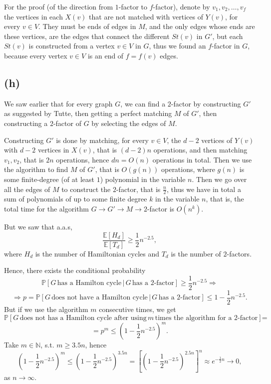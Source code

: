\documentclass{article}
\begin{document}
For the proof (of the direction from $1$-factor to $f$-factor), denote by $v_1,v_2,\dots,v_f$ the vertices in each $X(v)$ that are not matched with vertices of $Y(v)$, for every $v\in{V}$. They must be ends of edges in $M$, and the only edges whose ends are these vertices, are the edges that connect the different $St(v)$ in $G'$, but each $St(v)$ is constructed from a vertex $v\in{V}$ in $G$, thus we found an $f$-factor in $G$, because every vertex $v\in{V}$ is an end of $f=f(v)$ edges.
\subsection*{(h)}
We saw earlier that for every graph $G$, we can find a $2$-factor by constructing $G'$ as suggested by Tutte, then getting a perfect matching $M$ of $G'$, then constructing a $2$-factor of $G$ by selecting the edges of $M$. 

Constructing $G'$ is done by matching, for every $v\in{V}$, the $d-2$ vertices of $Y(v)$ with $d-2$ vertices in $X(v)$, that is $(d-2)n$ operations, and then matching $v_1,v_2$, that is $2n$ operations, hence $dn=O(n)$ operations in total.
Then we use the algorithm to find $M$ of $G'$, that is $O(g(n))$ operations, where $g(n)$ is some finite-degree (of at least $1$) polynomial in the variable $n$. Then we go over all the edges of $M$ to construct the $2$-factor, that is $\frac{n}{2}$, thus we have in total a sum of polynomials of up to some finite degree $k$ in the variable $n$, that is, the total time for the algorithm $G\rightarrow{G'}\rightarrow{M}\rightarrow{2}$-factor is $O(n^k)$.

But we saw that a.a.s,
\[
\frac{\mathbb{E}[H_d]}{\mathbb{E}[T_d]}\geq\frac{1}{2}n^{-2.5},
\]
where $H_d$ is the number of Hamiltonian cycles and $T_d$ is the number of $2$-factors.

Hence, there exists the conditional probability
\[\mathbb{P}[G\,\text{has a Hamilton cycle}\,|\,G\,\text{has a 2-factor}]\geq\frac{1}{2}n^{-2.5}\Rightarrow\]\[\Rightarrow{p}=\mathbb{P}[G\,\text{does not have a Hamilton cycle}\,|\,G\,\text{has a 2-factor}]\leq{1}-\frac{1}{2}n^{-2.5}.\]
But if we use the algorithm $m$ consecutive times, we get 
\[
\mathbb{P}[G\,\text{does not has a Hamilton cycle after using}\,m\, \text{times the algorithm for a $2$-factor}]=\]\[=p^m\leq(1-\frac{1}{2}n^{-2.5})^m.
\]
Take $m\in\mathbb{N}$, s.t. $m\geq{3.5n}$, hence 
\[(1-\frac{1}{2}n^{-2.5})^m\leq(1-\frac{1}{2}n^{-2.5})^{3.5n}=[(1-\frac{1}{2}n^{-2.5})^{2.5n}]^n\approx{e}^{-\frac{1}{2}n}\rightarrow{0},
\]
as $n\rightarrow\infty$.
\end{document}
